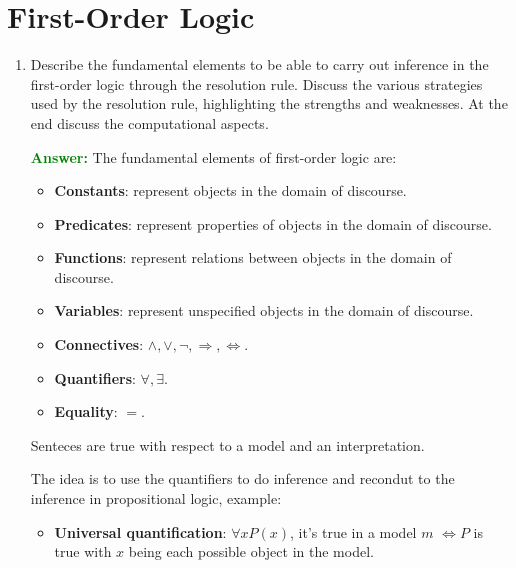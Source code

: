 \documentclass[12pt]{article}
\begin{document}
\section{First-Order Logic}
\begin{enumerate}[label=\textbf{FOL.\arabic*}]

    \item Describe the fundamental elements to be able to carry out inference in the first-order logic through the resolution rule.
    Discuss the various strategies used by the resolution rule, highlighting the strengths and weaknesses.
    At the end discuss the computational aspects.

    \textcolor{green}{\textbf{Answer:}}
    The fundamental elements of first-order logic are:
    \begin{itemize}
        \item \textbf{Constants}: represent objects in the domain of discourse.
        \item \textbf{Predicates}: represent properties of objects in the domain of discourse.
        \item \textbf{Functions}: represent relations between objects in the domain of discourse.
        \item \textbf{Variables}: represent unspecified objects in the domain of discourse.
        \item \textbf{Connectives}: $\land,\lor,\lnot,\Rightarrow,\Leftrightarrow$.
        \item \textbf{Quantifiers}: $\forall,\exists$.
        \item \textbf{Equality}: $=$.
    \end{itemize}
    Senteces are true with respect to a model and an interpretation.

    The idea is to use the quantifiers to do inference and recondut to the inference in propositional logic, example:
    \begin{itemize}
        \item\textbf{Universal quantification}: $\forall x P(x)$, it's true in a model $m$ $\iff P$ is true with $x$ being each 
        possible object in the model.


\end{itemize}
\end{enumerate}
\end{document}
